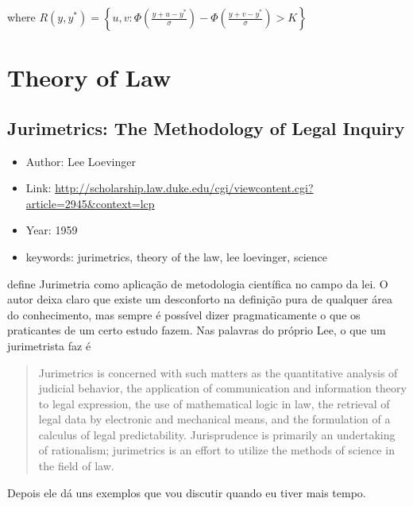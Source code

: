 \documentclass[]{report}
\providecommand{\tightlist}{%
  \setlength{\itemsep}{0pt}\setlength{\parskip}{0pt}}
\theoremstyle{definition}
\theoremstyle{definition}
\theoremstyle{definition}
\theoremstyle{remark}
\begin{document}
where
\(R(y, y^*) = \left\{u,v: \Phi\left(\frac{y+u-y^*}{\sigma}\right) - \Phi\left(\frac{y+v - y^*}{\sigma}\right) > K\right\}\)

\chapter{Theory of Law}\label{theory-of-law}

\section{Jurimetrics: The Methodology of Legal
Inquiry}\label{jurimetrics-the-methodology-of-legal-inquiry}

\begin{itemize}
\tightlist
\item
  Author: Lee Loevinger
\item
  Link:
  \url{http://scholarship.law.duke.edu/cgi/viewcontent.cgi?article=2945\&context=lcp}
\item
  Year: 1959
\item
  keywords: jurimetrics, theory of the law, lee loevinger, science
\end{itemize}

\citep{loevinger1963jurimetrics} define Jurimetria como aplicação de
metodologia científica no campo da lei. O autor deixa claro que existe
um desconforto na definição pura de qualquer área do conhecimento, mas
sempre é possível dizer pragmaticamente o que os praticantes de um certo
estudo fazem. Nas palavras do próprio Lee, o que um jurimetrista faz é

\begin{quote}
Jurimetrics is concerned with such matters as the quantitative analysis
of judicial behavior, the application of communication and information
theory to legal expression, the use of mathematical logic in law, the
retrieval of legal data by electronic and mechanical means, and the
formulation of a calculus of legal predictability. Jurisprudence is
primarily an undertaking of rationalism; jurimetrics is an effort to
utilize the methods of science in the field of law.
\end{quote}

Depois ele dá uns exemplos que vou discutir quando eu tiver mais tempo.


\end{document}
